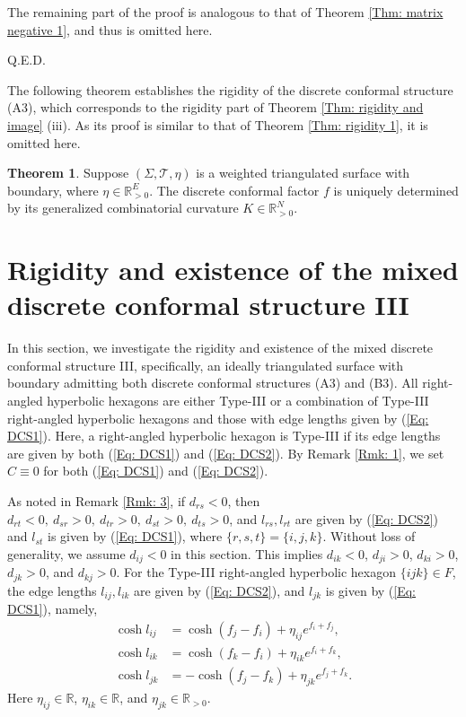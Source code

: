 \documentclass[12pt]{amsart}
\theoremstyle{definition}
\newtheorem{theorem}{Theorem}[section]
\def\qed{\hfill{Q.E.D.}\smallskip}
\begin{document}
The remaining part of the proof is analogous to that of Theorem \ref{Thm: matrix negative 1}, and thus is omitted here.

\qed

The following theorem establishes the rigidity of the discrete conformal structure (A3),
which corresponds to the rigidity part of Theorem \ref{Thm: rigidity and image} (iii).
As its proof is similar to that of Theorem \ref{Thm: rigidity 1}, it is omitted here.

\begin{theorem}\label{Thm: rigidity 2}
Suppose $(\Sigma,\mathcal{T},\eta)$ is a weighted triangulated surface with boundary, where $\eta\in \mathbb{R}_{>0}^E$.
The discrete conformal factor $f$ is uniquely determined by its generalized combinatorial curvature $K\in \mathbb{R}^N_{>0}$.
\end{theorem}


\section{Rigidity and existence of the mixed discrete conformal structure III}\label{section III}

In this section, we investigate the rigidity and existence of the mixed discrete conformal structure III, specifically, an ideally triangulated surface with boundary admitting both discrete conformal structures (A3) and (B3). 
All right-angled hyperbolic hexagons are either Type-III or a combination of Type-III right-angled hyperbolic hexagons and those with edge lengths given by (\ref{Eq: DCS1}). 
Here, a right-angled hyperbolic hexagon is Type-III if its edge lengths are given by both (\ref{Eq: DCS1}) and (\ref{Eq: DCS2}). 
By Remark \ref{Rmk: 1}, we set $C\equiv 0$ for both (\ref{Eq: DCS1}) and (\ref{Eq: DCS2}).

As noted in Remark \ref{Rmk: 3},
if $d_{rs}<0$, then $d_{rt}<0,\ d_{sr}>0,\ d_{tr}>0,\ d_{st}>0,\ d_{ts}>0$,
and $l_{rs}, l_{rt}$ are given by (\ref{Eq: DCS2}) and $l_{st}$ is given by (\ref{Eq: DCS1}),
where $\{r,s,t\}=\{i,j,k\}$.
Without loss of generality, we assume $d_{ij}<0$ in this section.
This implies $d_{ik}<0$, $d_{ji}>0$, $d_{ki}>0$, $d_{jk}>0$, and $d_{kj}>0$.
For the Type-III right-angled hyperbolic hexagon $\{ijk\}\in F$,
the edge lengths $l_{ij},l_{ik}$ are given by (\ref{Eq: DCS2}), and $l_{jk}$ is given by (\ref{Eq: DCS1}), namely,
\begin{equation}\label{Eq: F37}
\begin{aligned}
\cosh l_{ij}
&=\cosh(f_j-f_i)+\eta_{ij}e^{f_i+f_j},\\
\cosh l_{ik}
&=\cosh(f_k-f_i)+\eta_{ik}e^{f_i+f_k},\\
\cosh l_{jk}
&=-\cosh(f_j-f_k)+\eta_{jk}e^{f_j+f_k}.
\end{aligned}
\end{equation}
Here $\eta_{ij}\in \mathbb{R}$, $\eta_{ik} \in \mathbb{R}$, and $\eta_{jk}\in \mathbb{R}_{>0}$.
\end{document}
